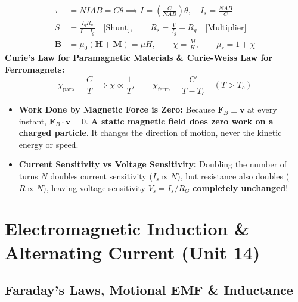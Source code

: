 \documentclass[10pt,twoside,openright]{book}
\begin{document}
\begin{formulabox}
\begin{align}
  \tau &= N I A B = C\theta \implies I = \left(\frac{C}{NAB}\right)\theta, \quad I_s = \frac{NAB}{C} \\
  S &= \frac{I_g R_g}{I - I_g} \quad \text{[Shunt]}, \qquad R_s = \frac{V}{I_g} - R_g \quad \text{[Multiplier]} \\
  \mathbf{B} &= \mu_0(\mathbf{H} + \mathbf{M}) = \mu H, \qquad \chi = \frac{M}{H}, \qquad \mu_r = 1 + \chi
\end{align}
\textbf{Curie's Law for Paramagnetic Materials \& Curie-Weiss Law for Ferromagnets:}
\begin{equation}
  \chi_{\text{para}} = \frac{C}{T} \implies \chi \propto \frac{1}{T}, \qquad \chi_{\text{ferro}} = \frac{C'}{T - T_c} \quad (T > T_c)
\end{equation}
\end{formulabox}

\begin{trapbox}
\begin{itemize}
  \item \textbf{Work Done by Magnetic Force is Zero:} Because $\mathbf{F}_B \perp \mathbf{v}$ at every instant, $\mathbf{F}_B\cdot\mathbf{v} = 0$. \textbf{A static magnetic field does zero work on a charged particle}. It changes the direction of motion, never the kinetic energy or speed.
  \item \textbf{Current Sensitivity vs Voltage Sensitivity:} Doubling the number of turns $N$ doubles current sensitivity ($I_s \propto N$), but resistance also doubles ($R \propto N$), leaving voltage sensitivity $V_s = I_s / R_G$ \textbf{completely unchanged}!
\end{itemize}
\end{trapbox}

\newpage

\section{Electromagnetic Induction \& Alternating Current (Unit 14)}

\subsection{Faraday's Laws, Motional EMF \& Inductance}
\end{document}
